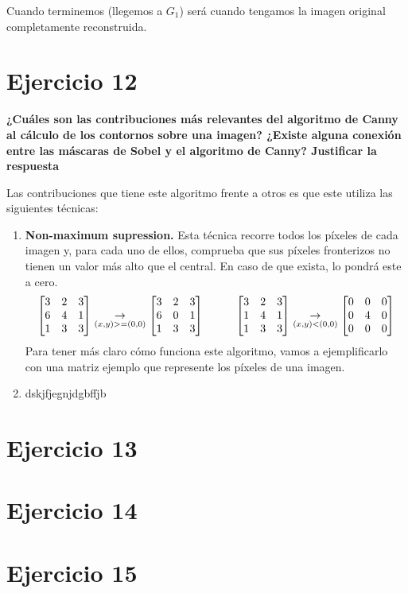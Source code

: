 \documentclass[11pt,a4paper]{article}
\begin{document}
Cuando terminemos (llegemos a $G_1$) será cuando tengamos la imagen original completamente reconstruida.

\section*{Ejercicio 12}

\textbf{¿Cuáles son las contribuciones más relevantes del algoritmo de Canny al cálculo de los contornos sobre una imagen? ¿Existe
alguna conexión entre las máscaras de Sobel y el algoritmo de Canny? Justificar la respuesta}

Las contribuciones que tiene este algoritmo frente a otros es que este utiliza las siguientes técnicas:
\begin{enumerate}
	\item \textbf{Non-maximum supression.} Esta técnica recorre todos los píxeles de cada imagen y, para cada uno de ellos, comprueba
	que sus píxeles fronterizos no tienen un valor más alto que el central. En caso de que exista, lo pondrá este a cero.
			\begin{equation*}
				\begin{bmatrix}
				3& 2& 3\\ 
				6& 4& 1\\ 
				1& 3& 3
				\end{bmatrix}
				\underset{(x,y)>=(0,0)}{\rightarrow}
				\begin{bmatrix}
				3& 2& 3\\ 
				6& 0& 1\\ 
				1& 3& 3
				\end{bmatrix}
				\hspace{10mm}
				\begin{bmatrix}
				3& 2& 3\\ 
				1& 4& 1\\ 
				1& 3& 3
				\end{bmatrix}
				\underset{(x,y)<(0,0)}{\rightarrow}
				\begin{bmatrix}
				0& 0& 0\\ 
				0& 4& 0\\ 
				0& 0& 0
				\end{bmatrix}
			\end{equation*}
	Para tener más claro cómo funciona este algoritmo, vamos a ejemplificarlo con una matriz ejemplo que represente los píxeles de una imagen.


	\item dskjfjegnjdgbffjb
\end{enumerate}


\section*{Ejercicio 13}


\section*{Ejercicio 14}


\section*{Ejercicio 15}
\end{document}
